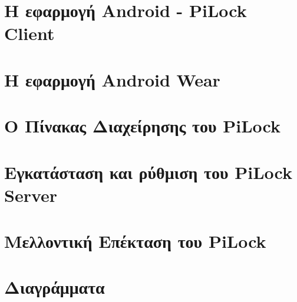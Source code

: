 \documentclass[12pt]{report}
\begin{document}
    \chapter{Η εφαρμογή Android - PiLock Client}
    

    \chapter{Η εφαρμογή Αndroid Wear}
    

    \chapter{Ο Πίνακας Διαχείρησης του PiLock}
    

    \chapter{Εγκατάσταση και ρύθμιση του PiLock Server}
    

    \chapter{Μελλοντική Επέκταση του PiLock}
    

    \appendix
    \chapter{Διαγράμματα}
    

    

    \printindex
    
\end{document}
